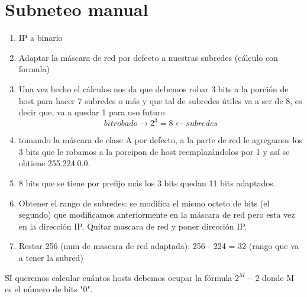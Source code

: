 \documentclass[letterpaper,12pt]{article}
\begin{document}
\begin{sloppypar}
\section{Subneteo manual}
\begin{enumerate}
    \item IP a binario
    \item Adaptar la máscara de red por defecto a nuestras subredes (cálculo con formula)
    \item Una vez hecho el cálculos nos da que debemos robar 3 bits a la porción de host para hacer 7 subredes o más y que tal de subredes útiles va a ser de 8, es decir que, va a quedar 1 para uso futuro
    $$bit robado \longrightarrow 2^3 = 8 \longleftarrow subredes$$
    \item tomando la máscara de clase A por defecto, a la parte de red le agregamos los 3 bits que le robamos a la porcipon de host reemplazándolos por 1 y así se obtiene 255.224.0.0.
    \item 8 bits que se tiene por prefijo más los 3 bits quedan 11 bits adaptados.
    \item Obtener el rango de subredes: se modifica el mismo octeto de bits (el segundo) que modificamos anteriormente en la máscara de red pero esta vez en la dirección IP. Quitar mascara de red y poner dirección IP.
    \item Restar 256 (num de mascara de red adaptada): 256 - 224 = 32 (rango que va a tener la subred)
\end{enumerate}

SI queremos calcular cuántos hosts debemos ocupar la fórmula $2^M - 2$ donde M es el número de bits "0".


\end{sloppypar}
\end{document}

